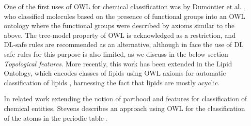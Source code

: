 \documentclass[10pt]{bmc_article}
\newenvironment{bmcformat}{\baselineskip20pt\sloppy\setboolean{publ}{false}}{\baselineskip20pt\sloppy}
\begin{document}
\begin{bmcformat}

One of the first uses of OWL for chemical classification was by Dumontier et al. \cite{dumontier2007}, who classified molecules based on the presence of functional groups into an OWL ontology where the functional groups were described by axioms similar to the above. The tree-model property of OWL is acknowledged as a restriction, and DL-safe rules \cite{dumontier2007} are recommended as an alternative, although in face the use of DL safe rules for this purpose is also limited, as we discuss in the below section \textit{Topological features}. More recently, this work has been extended in the Lipid Ontology, which encodes classes of lipids using OWL axioms for automatic classification of lipids \cite{chepelevlipids2011}, harnessing the fact that lipids are mostly acyclic. 
 
In related work extending the notion of parthood and features for classification of chemical entities, Stevens describes an approach using OWL for the classification of the atoms in the periodic table \cite{stevens2011}. 





\end{bmcformat}
\end{document}
